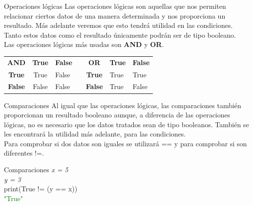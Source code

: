 \documentclass{beamer}
\begin{document}
\begin{frame}{Operaciones lógicas}
Las operaciones lógicas son aquellas que nos permiten relacionar ciertos datos de una manera determinada y nos proporciona un resultado. Más adelante veremos que esto tendrá utilidad en las condiciones.\\
Tanto estos datos como el resultado únicamente podrán ser de tipo booleano.\\
Las operaciones lógicas más usadas son \textbf{AND} y \textbf{OR}.
\begin{table}[]
\begin{tabular}{|c|c|l|l|c|l|l|}
\cline{1-3} \cline{5-7}
\textbf{AND}   & \textbf{True}  & \textbf{False} &  & \textbf{OR}    & \textbf{True} & \textbf{False} \\ \cline{1-3} \cline{5-7} 
\textbf{True}  & True  & False &  & \textbf{True}  & True & True  \\ \cline{1-3} \cline{5-7} 
\textbf{False} & False & False &  & \textbf{False} & True & False \\ \cline{1-3} \cline{5-7} 
\end{tabular}
\end{table}
\end{frame}
\begin{frame}{Comparaciones}
Al igual que las operaciones lógicas, las comparaciones también proporcionan un resultado booleano aunque, a diferencia de las operaciones lógicas, no es necesario que los datos tratados sean de tipo booleanos. También se les encontrará la utilidad más adelante, para las condiciones.\\
Para comprobar si dos datos son iguales se utilizará == y para comprobar si son diferentes !=.
\begin{Programexample} {Comparaciones}
\centering
\textit{x = 5}\\
\textit{y = 3}\\
print(True != (y == x))\\
\textcolor{green}{"True"}
\end{Programexample}

\end{frame}
\end{document}
